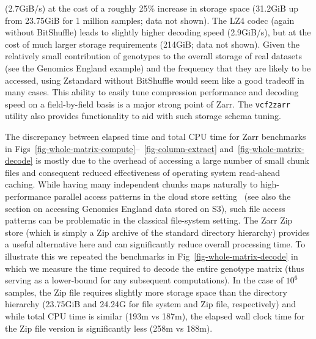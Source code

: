 \documentclass[a4paper,num-refs]{oup-contemporary}
\begin{document}
(2.7GiB/s) at the cost of a roughly 25\% increase in storage
space (31.2GiB up from 23.75GiB for 1 million samples; data not
shown). The LZ4 codec (again without BitShuffle) leads to slightly higher
decoding speed (2.9GiB/s), but at the cost of much larger storage requirements
(214GiB; data not shown).
Given the relatively small contribution of genotypes to the
overall storage of real datasets (see the Genomics England example)
and the frequency that they are likely to be accessed, using
Zstandard without BitShuffle
would seem like a good tradeoff in many cases.
This ability to easily tune compression performance
and decoding speed on a field-by-field basis is a major strong
point of Zarr. The \texttt{vcf2zarr} utility also provides
functionality to aid with such storage schema tuning.

The discrepancy between elapsed time and total CPU time for Zarr
benchmarks in
Figs~\ref{fig-whole-matrix-compute}--~\ref{fig-column-extract}
and~\ref{fig-whole-matrix-decode} is mostly due to the overhead
of accessing a large number of small chunk files and
consequent reduced effectiveness of operating system read-ahead caching.
While having many independent chunks maps
naturally to high-performance parallel access patterns
in the cloud store setting~\citep{durner2023exploiting}
(see also the section on accessing Genomics England data stored on S3),
such file access patterns can be problematic in the
classical file-system setting.
The Zarr Zip store (which is simply a Zip archive of the standard directory
hierarchy) provides a useful alternative here and can
significantly reduce overall processing time. To illustrate this
we repeated the benchmarks in Fig~\ref{fig-whole-matrix-decode} in
which we measure the time required to decode the entire genotype
matrix (thus serving as a lower-bound for any subsequent computations).
In the case of $10^6$ samples, the Zip file requires slightly more
storage space than the directory hierarchy (23.75GiB and 24.24G
for file system and Zip file, respectively)
and while total
CPU time is similar (193m vs 187m), the elapsed wall clock
time for the Zip file version is significantly less
(258m vs 188m).
\end{document}
